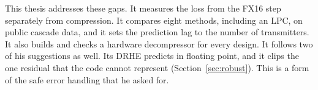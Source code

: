 This thesis addresses these gaps. It measures the loss from the FX16 step
separately from compression. It compares eight methods, including an LPC, on
public cascade data, and it sets the prediction lag to the number of
transmitters. It also builds and checks a hardware decompressor for every
design. It follows two of his suggestions as well. Its DRHE predicts in
floating point, and it clips the one residual that the code cannot represent
(Section~\ref{sec:robust}). This is a form of the safe error handling that he
asked for.
\label{ch:kiem:end}
